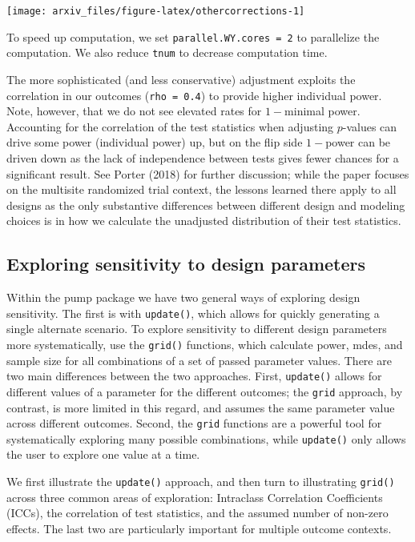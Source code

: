 \documentclass{article}
\begin{document}
\begin{center}\texttt{[image: arxiv\_files/figure-latex/othercorrections-1]} \end{center}

To speed up computation, we set \texttt{parallel.WY.cores\ =\ 2} to
parallelize the computation. We also reduce \texttt{tnum} to decrease
computation time.

The more sophisticated (and less conservative) adjustment exploits the
correlation in our outcomes (\texttt{rho\ =\ 0.4}) to provide higher
individual power. Note, however, that we do not see elevated rates for
\(1-\)minimal power. Accounting for the correlation of the test
statistics when adjusting \(p\)-values can drive some power (individual
power) up, but on the flip side \(1-\)power can be driven down as the
lack of independence between tests gives fewer chances for a significant
result. See Porter (2018) for further discussion; while the paper
focuses on the multisite randomized trial context, the lessons learned
there apply to all designs as the only substantive differences between
different design and modeling choices is in how we calculate the
unadjusted distribution of their test statistics.

\subsection{Exploring sensitivity to design parameters}

Within the pump package we have two general ways of exploring design
sensitivity. The first is with \texttt{update()}, which allows for
quickly generating a single alternate scenario. To explore sensitivity
to different design parameters more systematically, use the
\texttt{grid()} functions, which calculate power, mdes, and sample size
for all combinations of a set of passed parameter values. There are two
main differences between the two approaches. First, \texttt{update()}
allows for different values of a parameter for the different outcomes;
the \texttt{grid} approach, by contrast, is more limited in this regard,
and assumes the same parameter value across different outcomes. Second,
the \texttt{grid} functions are a powerful tool for systematically
exploring many possible combinations, while \texttt{update()} only
allows the user to explore one value at a time.

We first illustrate the \texttt{update()} approach, and then turn to
illustrating \texttt{grid()} across three common areas of exploration:
Intraclass Correlation Coefficients (ICCs), the correlation of test
statistics, and the assumed number of non-zero effects. The last two are
particularly important for multiple outcome contexts.
\end{document}
